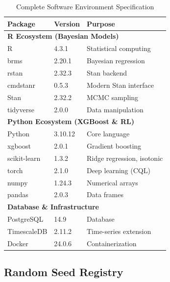 \begin{table}[htbp]
\centering
\caption{Complete Software Environment Specification}
\label{tab:software-versions}
\small
\begin{tabular}{@{} l l l @{}}
\toprule
\textbf{Package} & \textbf{Version} & \textbf{Purpose} \\
\midrule
\multicolumn{3}{l}{\textbf{R Ecosystem (Bayesian Models)}} \\
R & 4.3.1 & Statistical computing \\
brms & 2.20.1 & Bayesian regression \\
rstan & 2.32.3 & Stan backend \\
cmdstanr & 0.5.3 & Modern Stan interface \\
Stan & 2.32.2 & MCMC sampling \\
tidyverse & 2.0.0 & Data manipulation \\
\midrule
\multicolumn{3}{l}{\textbf{Python Ecosystem (XGBoost \& RL)}} \\
Python & 3.10.12 & Core language \\
xgboost & 2.0.1 & Gradient boosting \\
scikit-learn & 1.3.2 & Ridge regression, isotonic \\
torch & 2.1.0 & Deep learning (CQL) \\
numpy & 1.24.3 & Numerical arrays \\
pandas & 2.0.3 & Data frames \\
\midrule
\multicolumn{3}{l}{\textbf{Database \& Infrastructure}} \\
PostgreSQL & 14.9 & Database \\
TimescaleDB & 2.11.2 & Time-series extension \\
Docker & 24.0.6 & Containerization \\
\bottomrule
\end{tabular}
\end{table}

\subsection{Random Seed Registry}

